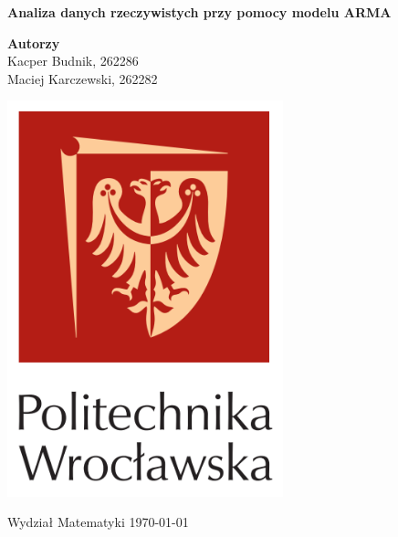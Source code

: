 \documentclass[12pt]{article}
\begin{document}
	\begin{titlepage}
		\begin{center}
			
			\textbf{\Huge  Analiza danych rzeczywistych przy pomocy modelu ARMA}
			
			\vspace{0.5cm}
			
			\vspace{1.5cm}
			
			\textbf{\LARGE Autorzy}\\
			\vspace{0.5cm}
			\large Kacper Budnik, 262286\\
			\large Maciej Karczewski, 262282\\
			
			
			\vfill
			
			\vspace{0.4cm}
				\includegraphics[width=0.60\textwidth]{img/logo.PNG}

			
			\vspace{0.8cm}
			Wydział Matematyki	
			\today
		\end{center}
	\end{titlepage}
	\tableofcontents
	\newpage
	
\end{document}

